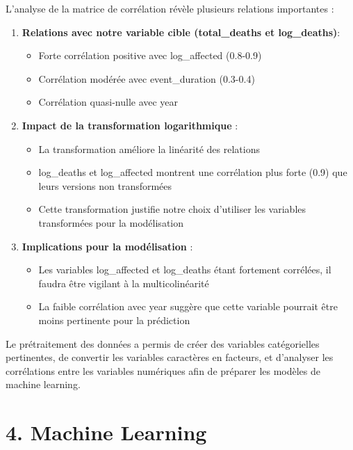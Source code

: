 \documentclass[
]{article}
\providecommand{\tightlist}{%
  \setlength{\itemsep}{0pt}\setlength{\parskip}{0pt}}
\begin{document}
L'analyse de la matrice de corrélation révèle plusieurs relations
importantes :

\begin{enumerate}
\def\labelenumi{\arabic{enumi}.}
\tightlist
\item
  \textbf{Relations avec notre variable cible (total\_deaths et
  log\_deaths)}:

  \begin{itemize}
  \tightlist
  \item
    Forte corrélation positive avec log\_affected (0.8-0.9)
  \item
    Corrélation modérée avec event\_duration (0.3-0.4)
  \item
    Corrélation quasi-nulle avec year
  \end{itemize}
\item
  \textbf{Impact de la transformation logarithmique} :

  \begin{itemize}
  \tightlist
  \item
    La transformation améliore la linéarité des relations
  \item
    log\_deaths et log\_affected montrent une corrélation plus forte
    (0.9) que leurs versions non transformées
  \item
    Cette transformation justifie notre choix d'utiliser les variables
    transformées pour la modélisation
  \end{itemize}
\item
  \textbf{Implications pour la modélisation} :

  \begin{itemize}
  \tightlist
  \item
    Les variables log\_affected et log\_deaths étant fortement
    corrélées, il faudra être vigilant à la multicolinéarité
  \item
    La faible corrélation avec year suggère que cette variable pourrait
    être moins pertinente pour la prédiction
  \end{itemize}
\end{enumerate}

Le prétraitement des données a permis de créer des variables
catégorielles pertinentes, de convertir les variables caractères en
facteurs, et d'analyser les corrélations entre les variables numériques
afin de préparer les modèles de machine learning.

\section{4. Machine Learning}\label{machine-learning}
\end{document}

